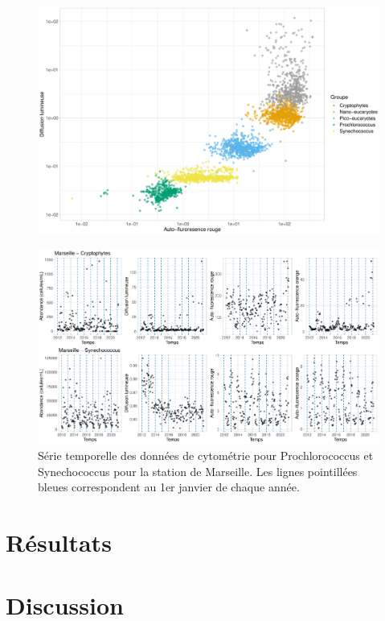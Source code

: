 \documentclass[12pt]{article}
\begin{document}
\begin{figure}
\centering
\includegraphics[width=.75 \textwidth]{fig/visualisation_phyto.pdf}
\caption{}
\end{figure}

\begin{figure}
\centering
\includegraphics[width=\textwidth]{fig/visualisation_cyano.pdf}
\caption{Série temporelle des données de cytométrie pour Prochlorococcus et Synechococcus pour la station de Marseille. Les lignes pointillées bleues correspondent au 1er janvier de chaque année.}
\end{figure}




\section{Résultats}



\section{Discussion}
\end{document}
